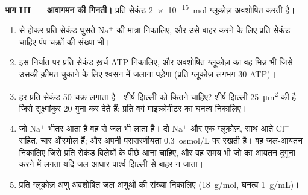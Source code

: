 \begin{problem}
\medskip
\noindent\textbf{भाग III --- आवागमन की गिनती।}
 प्रति सेकंड \qty{2e-15}{mol} ग्लूकोज़ अवशोषित करती है।
\begin{enumerate}[resume]
  \item {} से होकर प्रति सेकंड घुसते $\mathrm{Na^+}$ की मात्रा
        निकालिए, और उसे बाहर करने के लिए प्रति सेकंड चाहिए पंप-चक्रों
        की संख्या भी।
  \item इस निर्यात पर प्रति सेकंड ख़र्च ATP निकालिए, और अवशोषित
        ग्लूकोज़ का वह भिन्न भी जिसे उसकी क़ीमत चुकाने के लिए श्वसन में
        जलाना पड़ेगा (प्रति ग्लूकोज़ लगभग 30 ATP)।
  \item हर  प्रति सेकंड \qty{50}{} चक्र लगाता है। शीर्ष झिल्ली को
        कितने  चाहिए? शीर्ष झिल्ली \qty{25}{\micro m^2} की है
        जिसे सूक्ष्मांकुर \qty{20}{} गुना कर देते हैं: प्रति वर्ग
        माइक्रोमीटर  का घनत्व निकालिए।
  \item जो $\mathrm{Na^+}$ भीतर आता है वह  से जल भी लाता है। दो
        $\mathrm{Na^+}$ और एक ग्लूकोज़, साथ आते $\mathrm{Cl^-}$ सहित,
        चार ऑस्मोल हैं; और  अपनी परासरणीयता \qty{0.3}{osmol/L} पर
        रखती है। वह जल-आयतन निकालिए जिसे प्रति सेकंड विलेयों के पीछे
        आना चाहिए, और वह समय भी जो  का आयतन दुगुना करने में लगता
        यदि जल आधार-पार्श्व झिल्ली से बाहर न जाता।
  \item प्रति ग्लूकोज़ अणु अवशोषित जल अणुओं की संख्या निकालिए
        (\qty{18}{g/mol}, घनत्व \qty{1}{g/mL})।
\end{enumerate}


\end{problem}
